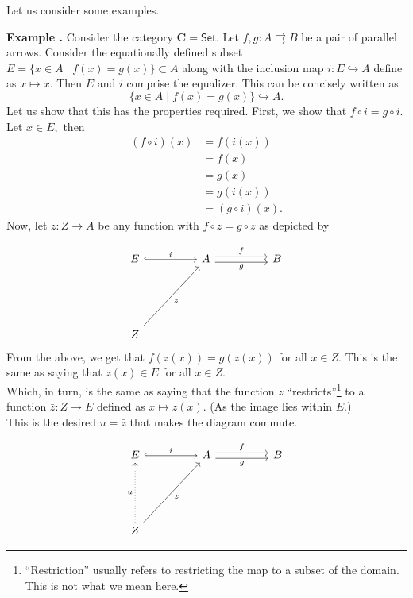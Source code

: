 \documentclass[11pt,leqno,landscape,semhelv]{seminar}
\theoremstyle{definition}
\numberwithin{joke}{section}
\numberwithin{thm}{section}
\numberwithin{equation}{section}
\newcommand{\example}[1]{\refstepcounter{thm}\par\medskip
   {\textbf{Example \thethm.} #1} \rmfamily}
\newcommand{\tto}{\rightrightarrows}
\begin{document}
Let us consider some examples.
\example{} Consider the category $\mathbf{C} = \mathsf{Set}.$ Let $f, g:A \tto B$ be a pair of parallel arrows. Consider the equationally defined subset $E = \{x \in A \mid f(x) = g(x)\} \subset A$ along with the inclusion map $i:E \hookrightarrow A$ define as $x\mapsto x.$ Then $E$ and $i$ comprise the equalizer. This can be concisely written as
\begin{equation*} 
  \{x \in A \mid f(x) = g(x)\} \hookrightarrow A.
\end{equation*}
Let us show that this has the properties required. First, we show that $f\circ i = g\circ i.$ Let $x \in E,$ then
\begin{align*} 
  (f \circ i)(x) &= f(i(x))\\
  &= f(x)\\
  &= g(x)\\
  &= g(i(x))\\
  &= (g\circ i)(x).
\end{align*}
Now, let $z:Z \to A$ be any function with $f \circ z = g \circ z$ as depicted by

\begin{equation*} 
  \begin{tikzcd}
    E \arrow[rr, "i", hook] &  & A \arrow[rr, "g"', shift right] \arrow[rr, "f", shift left]&&B\\
    &&&&\\&&&&\\
    Z \arrow[rruuu, "z"'] &&&&  
    \end{tikzcd}
\end{equation*}
From the above, we get that $f(z(x)) = g(z(x))$ for all $x \in Z.$ This is the same as saying that $z(x) \in E$ for all $x \in Z.$\\
Which, in turn, is the same as saying that the function $z$ ``restricts''\footnote{``Restriction'' usually refers to restricting the map to a subset of the domain. This is not what we mean here.} to a function $\bar{z}:Z \to E$ defined as $x \mapsto z(x).$ (As the image lies within $E.$)\\
This is the desired $u = \bar{z}$ that makes the diagram commute.

\begin{equation*} 
  \begin{tikzcd}
    E \arrow[rr, "i", hook] &  & A \arrow[rr, "g"', shift right] \arrow[rr, "f", shift left]&&B\\
    &&&&\\&&&&\\
    Z \arrow[rruuu, "z"']  \arrow[uuu, "u", dotted] &&&&  
    \end{tikzcd}
\end{equation*}
\end{document}
